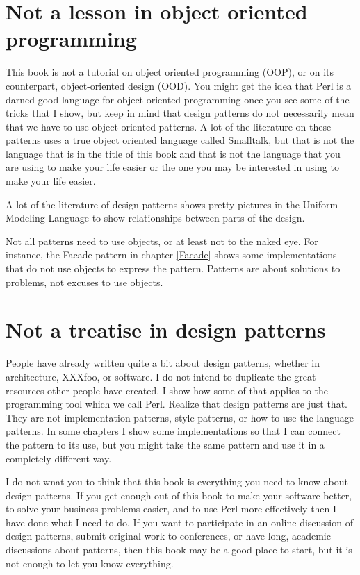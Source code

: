 
    \section{Not a lesson in object oriented programming}

This book is not a tutorial on object oriented programming (OOP),
or on its counterpart, object-oriented design (OOD).  You might get the
idea  that Perl is a darned good language for object-oriented
programming once you see some of the tricks that I show, but keep
in mind that design patterns do not necessarily mean that we have
to use object oriented patterns.  A lot of the literature on
these patterns uses a true object oriented language called 
Smalltalk, but that is not the language that is in the title 
of this book and that is not the language that you are using
to make your life easier or the one you may be interested in
using to make your life easier.

A lot of the literature of design patterns shows pretty pictures
in the Uniform Modeling Language to show relationships between
parts of the design.  

Not all patterns need to use objects, or at least not to the naked eye.
For instance, the Facade pattern in chapter \ref{Facade} shows
some implementations that do not use objects to express the
pattern.  Patterns are about solutions to problems, not
excuses to use objects.

    \section{Not a treatise in design patterns}

People have already written quite a bit about design patterns,
whether in architecture, XXXfoo, or software. I do not intend
to duplicate the great resources other people have created. I
show how some of that applies to the programming tool which we
call Perl.  Realize that design patterns  are just that.  They
are not implementation patterns, style patterns, or how to
use the language patterns.  In some chapters I show some
implementations so that I can connect the pattern to its use,
but you might take the same pattern and use it in a completely 
different way.

I do not wnat you to think that this book is everything you
need to know about design patterns.  If you get enough out of
this book to make your software better, to solve your business
problems easier, and to use Perl more effectively then I have
done what I need to do.  If you want to participate in an 
online discussion of design patterns, submit original work
to conferences, or have long, academic discussions about
patterns, then this book may be a good place to start, but
it is not enough to let you know everything.


